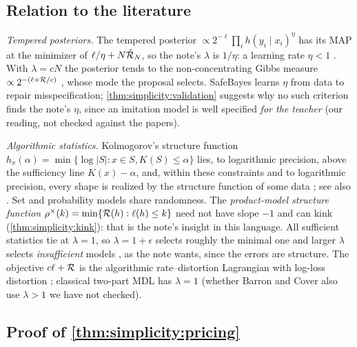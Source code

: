 \subsection{Relation to the literature}\label{app:simplicity:structure}

\emph{Tempered posteriors.} The tempered posterior $\propto2^{-\ell}\prod_ih(y_i\mid x_i)^\eta$ has its MAP at the minimizer of $\ell/\eta+N\hat{\mathcal R}_N$, so the note's $\lambda$ is $1/\eta$: a learning rate $\eta<1$ \citep{grunwald2012safe,grunwald2017inconsistency,zhang2006epsilon,bissiri2016general,bhattacharya2019fractional}. With $\lambda=cN$ the posterior tends to the non-concentrating Gibbs measure $\propto2^{-(\ell+\mathcal R/c)}$ \citep{catoni2007pac}, whose mode the proposal selects. SafeBayes learns $\eta$ from data to repair misspecification; \cref{thm:simplicity:validation} suggests why no such criterion finds the note's $\eta$, since an imitation model is well specified \emph{for the teacher} (our reading, not checked against the papers).

\emph{Algorithmic statistics.} Kolmogorov's structure function $h_x(\alpha)=\min\{\log|S|:x\in S,K(S)\le\alpha\}$ lies, to logarithmic precision, above the sufficiency line $K(x)-\alpha$, and, within these constraints and to logarithmic precision, every shape is realized by the structure function of some data \citep{vereshchagin2004kolmogorov}; see also \citet{gacs2001algorithmic,vereshchagin2017algorithmic}. Set and probability models share randomness. The \emph{product-model structure function} $\rho^\times(k)=\min\{\mathcal R(h):\ell(h)\le k\}$ need not have slope $-1$ and can kink (\cref{thm:simplicity:kink}): that is the note's insight in this language. All sufficient statistics tie at $\lambda=1$, so $\lambda=1+\epsilon$ selects roughly the minimal one and larger $\lambda$ selects \emph{insufficient} models , as the note wants, since the errors are structure. The objective $c\ell+\mathcal R$ is the algorithmic rate--distortion Lagrangian with log-loss distortion \citep{vereshchagin2010rate}; classical two-part MDL \citep{rissanen1978modeling,barron1991minimum,grunwald2007minimum} has $\lambda=1$ (whether Barron and Cover also use $\lambda>1$ we have not checked).

\subsection{Proof of \texorpdfstring{\cref{thm:simplicity:pricing}}{the pricing theorem}}\label{app:simplicity:pricing}

